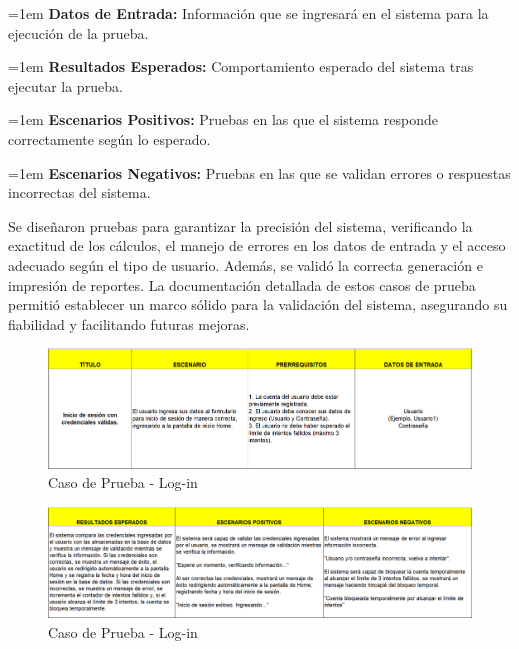 \documentclass[12pt,letterpaper,spanish, xcolor=table]{report}
\numberwithin{figure}{subsection}
\begin{document}
	{\leftskip=1em 
		\noindent 
		\textbf{Datos de Entrada:} Información que se ingresará en el sistema para la ejecución de la prueba.
		\par}
	
	{\leftskip=1em 
		\noindent 
		\textbf{Resultados Esperados:} Comportamiento esperado del sistema tras ejecutar la prueba.
		\par}
	
	{\leftskip=1em 
		\noindent 
		\textbf{Escenarios Positivos:} Pruebas en las que el sistema responde correctamente según lo esperado.
		\par}
	
	{\leftskip=1em 
		\noindent 
		\textbf{Escenarios Negativos:} Pruebas en las que se validan errores o respuestas incorrectas del sistema.\\
		\par}


	Se diseñaron pruebas para garantizar la precisión del sistema, verificando la exactitud de los cálculos, el manejo de errores en los datos de entrada y el acceso adecuado según el tipo de usuario. Además, se validó la correcta generación e impresión de reportes. La documentación detallada de estos casos de prueba permitió establecer un marco sólido para la validación del sistema, asegurando su fiabilidad y facilitando futuras mejoras.\\
	
	
	\begin{figure}[H]
		\centering
		\includegraphics[width=1.0\textwidth]
		{Imagenes/CalculadoraNutricional/CPLogin.png}
		\caption{Caso de Prueba - Log-in
		}\label{a2}
	\end{figure}
	
	\begin{figure}[H]
		\centering
		\includegraphics[width=1.0\textwidth]
		{Imagenes/CalculadoraNutricional/CPLogin2.png}
		\caption{Caso de Prueba - Log-in
		}\label{a2}
	\end{figure}
	
\end{document}
